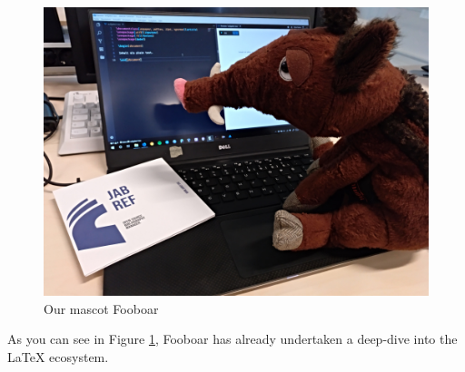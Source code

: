 \documentclass[a4paper, ngerman]{article}
\begin{document}
\thispagestyle{empty}
\begin{figure}[H]
  \includegraphics[width=\textwidth]{listings/references/fooboar.jpeg}
  \caption{Our mascot Fooboar}
  \label{img:fooboar}
\end{figure}

As you can see in Figure \ref{img:fooboar}, Fooboar has already undertaken a deep-dive into the \LaTeX{} ecosystem.
\end{document}
